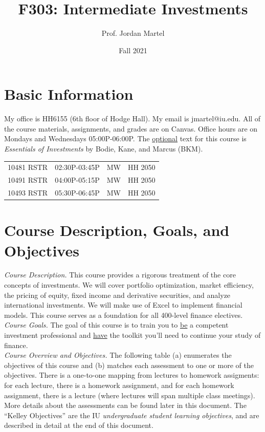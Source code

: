 \documentclass[12pt]{article} %
\title{F303: Intermediate Investments}
\author{Prof. Jordan Martel}
\date{Fall 2021}
\begin{document}
\maketitle
\section*{Basic Information}
My office is HH6155 (6th floor of Hodge Hall). My email is jmartel@iu.edu. All of the course materials, assignments, and grades are on Canvas. Office hours are on Mondays and Wednesdays 05:00P-06:00P. The \underline{optional} text for this course is \textit{Essentials of Investments} by Bodie, Kane, and Marcus (BKM). 
\begin{table}[h]
	\begin{center}
		\begin{tabular}{llll}
			10481 RSTR & 02:30P-03:45P & MW & HH 2050\\
			10491 RSTR & 04:00P-05:15P & MW & HH 2050\\
			10493 RSTR & 05:30P-06:45P & MW & HH 2050 
		\end{tabular}
	\end{center}
\end{table}
\section*{Course Description, Goals, and Objectives}
\noindent\textit{Course Description.} This course provides a rigorous treatment of the core concepts of investments. We will cover portfolio optimization, market efficiency, the pricing of equity, fixed income and derivative securities, and analyze international investments. We will make use of Excel to implement financial models. This course serves as a foundation for all 400-level finance electives. \\

\noindent\textit{Course Goals.} The goal of this course is to train you to \underline{be} a competent investment professional and \underline{have} the toolkit you'll need to continue your study of finance.\\

\noindent\textit{Course Overview and Objectives.} The following table (a) enumerates the objectives of this course and (b) matches each assessment to one or more of the objectives. There is a one-to-one mapping from lectures to homework assigments: for each lecture, there is a homework assignment, and for each homework assignment, there is a lecture (where lectures will span multiple class meetings). More details about the assessments can be found later in this document. The ``Kelley Objectives'' are the IU \textit{undergraduate student learning objectives}, and are described in detail at the end of this document.
\end{document}
